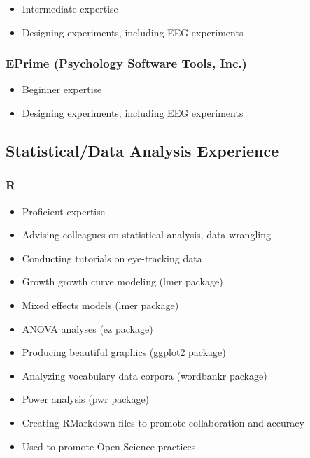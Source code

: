 \documentclass[10pt,a4paper,]{article}
\providecommand{\tightlist}{%
  \setlength{\itemsep}{0pt}\setlength{\parskip}{0pt}}
\begin{document}
\begin{itemize}
\tightlist
\item
  Intermediate expertise
\item
  Designing experiments, including EEG experiments
\end{itemize}

\hypertarget{eprime-psychology-software-tools-inc.}{%
\subsubsection{EPrime (Psychology Software Tools, Inc.)}\label{eprime-psychology-software-tools-inc.}}

\begin{itemize}
\tightlist
\item
  Beginner expertise
\item
  Designing experiments, including EEG experiments
\end{itemize}

\hypertarget{statisticaldata-analysis-experience}{%
\subsection{Statistical/Data Analysis Experience}\label{statisticaldata-analysis-experience}}

\hypertarget{r}{%
\subsubsection{R}\label{r}}

\begin{itemize}
\tightlist
\item
  Proficient expertise
\item
  Advising colleagues on statistical analysis, data wrangling
\item
  Conducting tutorials on eye-tracking data
\item
  Growth growth curve modeling (lmer package)
\item
  Mixed effects models (lmer package)
\item
  ANOVA analyses (ez package)
\item
  Producing beautiful graphics (ggplot2 package)
\item
  Analyzing vocabulary data corpora (wordbankr package)
\item
  Power analysis (pwr package)
\item
  Creating RMarkdown files to promote collaboration and accuracy
\item
  Used to promote Open Science practices
\end{itemize}
\end{document}
